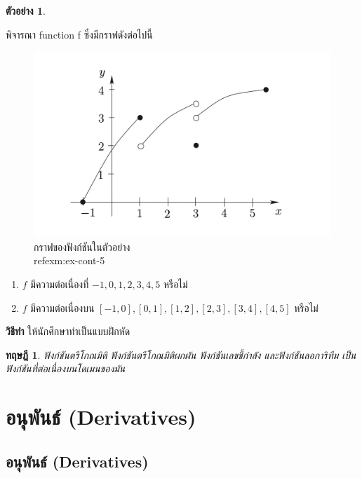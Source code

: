 \documentclass[
]{book}
\providecommand{\tightlist}{%
  \setlength{\itemsep}{0pt}\setlength{\parskip}{0pt}}
\newtheorem{theorem}{ทฤษฎี}[chapter]
\theoremstyle{definition}
\theoremstyle{definition}
\newtheorem{example}{ตัวอย่าง}[chapter]
\theoremstyle{definition}
\theoremstyle{definition}
\theoremstyle{remark}
\begin{document}
\begin{example}
\protect\hypertarget{exm:ex-cont-5}{}\label{exm:ex-cont-5}

พิจารณา function f ซึ่งมีกราฟดังต่อไปนี้

\begin{figure}

{\centering \includegraphics[width=0.5\linewidth]{images/fig-continuity-2} 

}

\caption{กราฟของฟังก์ชันในตัวอย่าง \\ref{exm:ex-cont-5}}\label{fig:fig-continuity-2}
\end{figure}

\begin{enumerate}
\def\labelenumi{\arabic{enumi}.}
\tightlist
\item
  \(f\) มีความต่อเนื่องที่ \(-1,0,1,2,3,4,5\) หรือไม่\\
\item
  \(f\) มีความต่อเนื่องบน
  \(\left[ -1,0\right] ,\left[ 0,1\right] ,\left[ 1,2\right] ,\left[ 2,3\right] ,\left[ 3,4\right] ,\left[ 4,5\right]\)
  หรือไม่
\end{enumerate}

\end{example}

\textbf{วิธีทำ} ให้นักศึกษาทำเป็นแบบฝึกหัด

\begin{theorem}
\protect\hypertarget{thm:thm-cont-5}{}\label{thm:thm-cont-5}ฟังก์ชันตรีโกณมิติ ฟังก์ชันตรีโกณมิติผกผัน ฟังก์ชันเลขชี้กำลัง และฟังก์ชันลอการิทึม
เป็นฟังก์ชันที่ต่อเนื่องบนโดเมนของมัน
\end{theorem}

\chapter{อนุพันธ์ (Derivatives)}\label{uxe2duxe19uxe1euxe19uxe18-derivatives}

\section{อนุพันธ์ (Derivatives)}\label{uxe2duxe19uxe1euxe19uxe18-derivatives-1}
\end{document}
